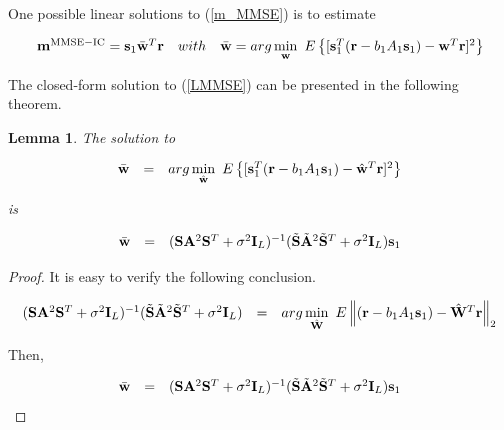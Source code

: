 \documentclass[a4paper,10pt,fleqn, twocolumn]{IEEETran}
\newtheorem{lemma}{Lemma}
\newcommand{\br}{{\mathbf r}}
\newcommand{\bA}{{\mathbf A}}
\newcommand{\bs}{{\bf s}}
\newcommand{\bm}{{\bf m}}
\newcommand{\bw}{{\bf w}}
\newcommand{\bS}{{\bf S}}
\newcommand{\bI}{{\bf I}}
\newcommand{\bW}{{\bf W}}
\begin{document}
One possible linear solutions to (\ref{m_MMSE}) is to estimate

\begin{equation}
\begin{array}{rcl}
\bm^{\rm
MMSE-IC}=\bs_1\bar\bw^T\br&\mbox{with}&\bar\bw=\mbox{arg}\min\limits_{\bw}\
E\left\{[\bs_1^T(\br-b_1A_1\bs_1)-\bw^T\br]^2\right\}
\end{array}\label{LMMSE}
\end{equation}

The closed-form solution to (\ref{LMMSE}) can be presented in the
following theorem.

\begin{lemma} The solution to

\begin{equation}
\begin{array}{rcl}
\bar\bw&=&\mbox{arg}\min\limits_{\hat\bw}\
E\left\{[\bs_1^T(\br-b_1A_1\bs_1)-\hat\bw^T\br]^2\right\}
\end{array}
\end{equation}

\noindent is

\begin{equation}
\begin{array}{rcl}
\bar\bw&=&(\bS\bA^2\bS^T+\sigma^2\bI_L)^{-1}(\tilde{\bS}\tilde{\bA}^2\tilde{\bS}^T+\sigma^2\bI_L)\bs_1
\end{array}
\end{equation}

\end{lemma}

\begin{proof}

It is easy to verify the following conclusion.

\begin{equation}
\begin{array}{rcl}
(\bS\bA^2\bS^T+\sigma^2\bI_L)^{-1}(\tilde{\bS}\tilde{\bA}^2\tilde{\bS}^T+\sigma^2\bI_L)&=&\mbox{arg}\min\limits_{\hat\bW}\
E\left\|(\br-b_1A_1\bs_1)-\hat\bW^T\br\right\|_2
\end{array}
\end{equation}

\noindent Then,

\begin{equation}
\begin{array}{rcl}
\bar\bw&=&(\bS\bA^2\bS^T+\sigma^2\bI_L)^{-1}(\tilde{\bS}\tilde{\bA}^2\tilde{\bS}^T+\sigma^2\bI_L)\bs_1
\end{array}
\end{equation}

\end{proof}
\end{document}
